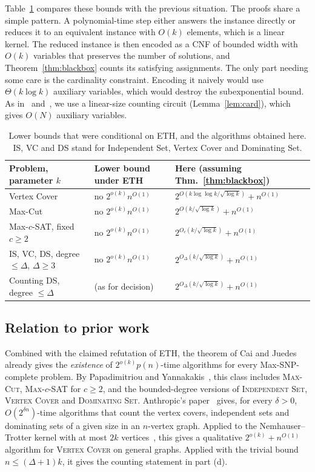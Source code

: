 \documentclass[11pt]{amsart}
\theoremstyle{definition}
\theoremstyle{remark}
\newcommand{\VC}{\textup{\textsc{Vertex Cover}}}
\newcommand{\MC}{\textup{\textsc{Max-Cut}}}
\newcommand{\MS}{\textup{\textsc{Max-$c$-SAT}}}
\newcommand{\IS}{\textup{\textsc{Independent Set}}}
\newcommand{\DS}{\textup{\textsc{Dominating Set}}}
\begin{document}
Table~\ref{tab:results} compares these bounds with the previous situation. The proofs share a simple pattern. A polynomial-time step either answers the instance directly or reduces it to an equivalent instance with $O(k)$ elements, which is a linear kernel. The reduced instance is then encoded as a CNF of bounded width with $O(k)$ variables that preserves the number of solutions, and Theorem~\ref{thm:blackbox} counts its satisfying assignments. The only part needing some care is the cardinality constraint. Encoding it naively would use $\Theta(k\log k)$ auxiliary variables, which would destroy the subexponential bound. As in~\cite[proof of Theorem~5]{IPZ01} and~\cite[proof of Corollary~7]{Cla26}, we use a linear-size counting circuit (Lemma~\ref{lem:card}), which gives $O(N)$ auxiliary variables.

\begin{table}[t]
\centering
\small
\begin{tabular}{@{}lll@{}}
\toprule
Problem, parameter $k$ & Lower bound under ETH & Here (assuming Thm.~\ref{thm:blackbox}) \\
\midrule
Vertex Cover & no $2^{o(k)}n^{O(1)}$ \cite{CJ03} & $2^{O(k\log\log k/\sqrt{\log k})}+n^{O(1)}$ \\
Max-Cut & no $2^{o(k)}n^{O(1)}$ \cite{CJ03} & $2^{O(k/\sqrt{\log k})}+n^{O(1)}$ \\
Max-$c$-SAT, fixed $c\ge2$ & no $2^{o(k)}n^{O(1)}$ \cite{CJ03} & $2^{O_c(k/\sqrt{\log k})}+n^{O(1)}$ \\
IS, VC, DS, degree $\le\Delta$, $\Delta\ge3$ & no $2^{o(k)}n^{O(1)}$ \cite{CJ03} & $2^{O_\Delta(k/\sqrt{\log k})}+n^{O(1)}$ \\
Counting DS, degree $\le\Delta$ & (as for decision) & $2^{O_\Delta(k/\sqrt{\log k})}+n^{O(1)}$ \\
\bottomrule
\end{tabular}
\caption{Lower bounds that were conditional on ETH, and the algorithms obtained here. IS, VC and DS stand for Independent Set, Vertex Cover and Dominating Set.}
\label{tab:results}
\end{table}

\subsection{Relation to prior work}

Combined with the claimed refutation of ETH, the theorem of Cai and Juedes~\cite{CJ03} already gives the \emph{existence} of $2^{o(k)}p(n)$-time algorithms for every Max-SNP-complete problem. By Papadimitriou and Yannakakis~\cite{PY91}, this class includes \MC, \MS{} for $c\ge 2$, and the bounded-degree versions of \IS, \VC{} and \DS. Anthropic's paper~\cite[Corollary~7]{Cla26} gives, for every $\delta>0$, $O(2^{\delta n})$-time algorithms that count the vertex covers, independent sets and dominating sets of a given size in an $n$-vertex graph. Applied to the Nemhauser--Trotter kernel with at most $2k$ vertices~\cite{NT75}, this gives a qualitative $2^{o(k)}+n^{O(1)}$ algorithm for \VC{} on general graphs. Applied with the trivial bound $n\le(\Delta+1)k$, it gives the counting statement in part (d).
\end{document}
